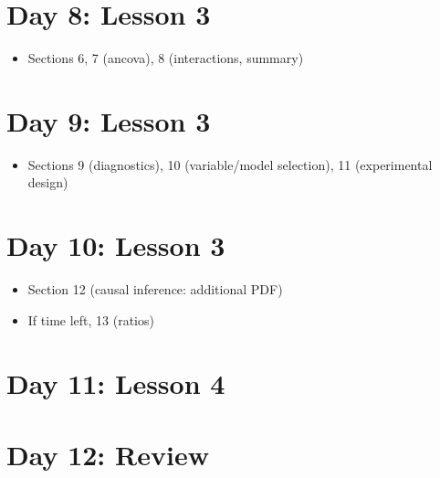 \documentclass[11pt]{article}
\begin{document}
\section*{Day 8: Lesson 3}
\label{sec:org565dee4}
\begin{itemize}
\item Sections 6, 7 (ancova), 8 (interactions, summary)
\end{itemize}
\section*{Day 9: Lesson 3}
\label{sec:orgd4d0172}
\begin{itemize}
\item Sections 9 (diagnostics), 10 (variable/model selection), 11 (experimental design)
\end{itemize}
\section*{Day 10: Lesson 3}
\label{sec:orgc356a49}
\begin{itemize}
\item Section 12 (causal inference: additional PDF)
\item If time left, 13 (ratios)
\end{itemize}
\section*{Day 11: Lesson 4}
\label{sec:orgf0ac6ce}

\section*{Day 12: Review}
\label{sec:org203bfe4}
\end{document}
